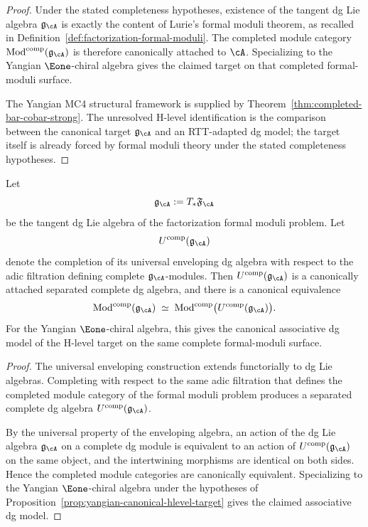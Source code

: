 \begin{proof}
Under the stated completeness hypotheses, existence of the tangent dg
Lie algebra $\mathfrak{g}_{\cA}$ is exactly the content of Lurie's
formal moduli theorem, as recalled in
Definition~\ref{def:factorization-formal-moduli}. The completed module
category $\operatorname{Mod}^{\mathrm{comp}}(\mathfrak{g}_{\cA})$ is
therefore canonically attached to $\cA$. Specializing to the Yangian
$\Eone$-chiral algebra gives the claimed target on that completed
formal-moduli surface.

The Yangian MC4 structural framework is supplied by
Theorem~\ref{thm:completed-bar-cobar-strong}. The unresolved H-level
identification is the comparison between the canonical target
$\mathfrak{g}_{\cA}$ and an RTT-adapted dg model; the target itself
is already forced by formal moduli theory under the stated
completeness hypotheses.
\end{proof}

\begin{proposition}
\label{prop:yangian-canonical-envelope}
Let
\[
\mathfrak{g}_{\cA}:=T_*\mathfrak{F}_{\cA}
\]
be the tangent dg Lie algebra of the factorization formal moduli
problem. Let
\[
U^{\mathrm{comp}}(\mathfrak{g}_{\cA})
\]
denote the completion of its universal enveloping dg algebra with
respect to the adic filtration defining complete
$\mathfrak{g}_{\cA}$-modules. Then
$U^{\mathrm{comp}}(\mathfrak{g}_{\cA})$ is a canonically attached
separated complete dg algebra, and there is a canonical equivalence
\[
\operatorname{Mod}^{\mathrm{comp}}(\mathfrak{g}_{\cA})
\;\simeq\;
\operatorname{Mod}^{\mathrm{comp}}\bigl(
 U^{\mathrm{comp}}(\mathfrak{g}_{\cA})
\bigr).
\]
For the Yangian $\Eone$-chiral algebra, this gives the canonical
associative dg model of the H-level target on the same complete
formal-moduli surface.
\end{proposition}

\begin{proof}
The universal enveloping construction extends functorially to dg Lie
algebras. Completing with respect to the same adic filtration that
defines the completed module category of the formal moduli problem
produces a separated complete dg algebra
$U^{\mathrm{comp}}(\mathfrak{g}_{\cA})$.

By the universal property of the enveloping algebra, an action of the
dg Lie algebra $\mathfrak{g}_{\cA}$ on a complete dg module is
equivalent to an action of
$U^{\mathrm{comp}}(\mathfrak{g}_{\cA})$ on the same object, and the
intertwining morphisms are identical on both sides. Hence the
completed module categories are canonically equivalent. Specializing
to the Yangian $\Eone$-chiral algebra under the hypotheses of
Proposition~\ref{prop:yangian-canonical-hlevel-target} gives the
claimed associative dg model.
\end{proof}

